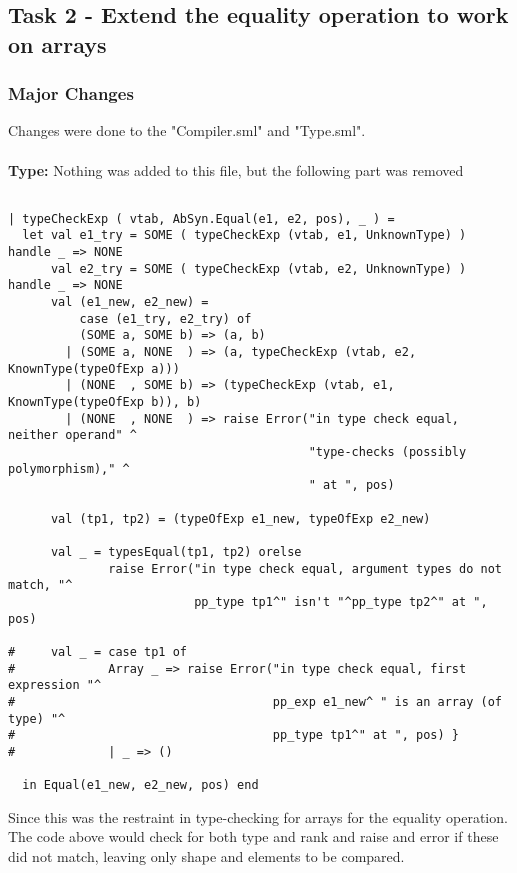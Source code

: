 \documentclass[12pt]{article}
\begin{document}
\newpage

\subsection{Task 2 - Extend the equality operation to work on arrays}
\subsubsection{Major Changes}
Changes were done to the "Compiler.sml" and "Type.sml".\\
\\
\textbf{Type:} Nothing was added to this file, but the following part was removed
\begingroup
    \fontsize{9pt}{12pt}\selectfont
    \begin{verbatim}

| typeCheckExp ( vtab, AbSyn.Equal(e1, e2, pos), _ ) =
  let val e1_try = SOME ( typeCheckExp (vtab, e1, UnknownType) ) handle _ => NONE
      val e2_try = SOME ( typeCheckExp (vtab, e2, UnknownType) ) handle _ => NONE
      val (e1_new, e2_new) =
          case (e1_try, e2_try) of
          (SOME a, SOME b) => (a, b)
        | (SOME a, NONE  ) => (a, typeCheckExp (vtab, e2, KnownType(typeOfExp a)))
        | (NONE  , SOME b) => (typeCheckExp (vtab, e1, KnownType(typeOfExp b)), b)
        | (NONE  , NONE  ) => raise Error("in type check equal, neither operand" ^
                                          "type-checks (possibly polymorphism)," ^
                                          " at ", pos)

      val (tp1, tp2) = (typeOfExp e1_new, typeOfExp e2_new)

      val _ = typesEqual(tp1, tp2) orelse
              raise Error("in type check equal, argument types do not match, "^
                          pp_type tp1^" isn't "^pp_type tp2^" at ", pos)
                          
#     val _ = case tp1 of
#             Array _ => raise Error("in type check equal, first expression "^
#                                    pp_exp e1_new^ " is an array (of type) "^
#                                    pp_type tp1^" at ", pos) }
#             | _ => ()

  in Equal(e1_new, e2_new, pos) end
    \end{verbatim}
\endgroup
Since this was the restraint in type-checking for arrays for the equality operation. The code above would check for both type and rank and raise and error if these did not match, leaving only shape and elements to be compared.\\
\end{document}
